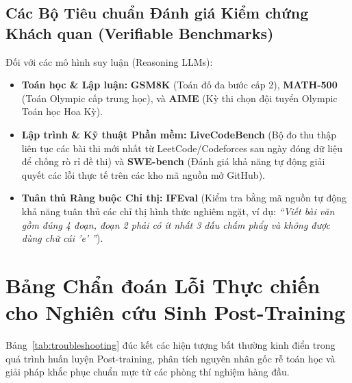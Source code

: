 \subsection{Các Bộ Tiêu chuẩn Đánh giá Kiểm chứng Khách quan (Verifiable Benchmarks)}
Đối với các mô hình suy luận (Reasoning LLMs):
\begin{itemize}[leftmargin=1.2cm]
    \item \textbf{Toán học \& Lập luận:} \textbf{GSM8K} \citep{cobbe2021training} (Toán đố đa bước cấp 2), \textbf{MATH-500} \citep{hendrycks2021measuring} (Toán Olympic cấp trung học), và \textbf{AIME} (Kỳ thi chọn đội tuyển Olympic Toán học Hoa Kỳ).
    \item \textbf{Lập trình \& Kỹ thuật Phần mềm:} \textbf{LiveCodeBench} \citep{jain2024livecodebench} (Bộ đo thu thập liên tục các bài thi mới nhất từ LeetCode/Codeforces sau ngày đóng dữ liệu để chống rò rỉ đề thi) và \textbf{SWE-bench} \citep{jimenez2024swebench} (Đánh giá khả năng tự động giải quyết các lỗi thực tế trên các kho mã nguồn mở GitHub).
    \item \textbf{Tuân thủ Ràng buộc Chỉ thị:} \textbf{IFEval} \citep{zhou2023instruction} (Kiểm tra bằng mã nguồn tự động khả năng tuân thủ các chỉ thị hình thức nghiêm ngặt, ví dụ: \textit{``Viết bài văn gồm đúng 4 đoạn, đoạn 2 phải có ít nhất 3 dấu chấm phẩy và không được dùng chữ cái 'e' ''}).
\end{itemize}

\section{Bảng Chẩn đoán Lỗi Thực chiến cho Nghiên cứu Sinh Post-Training}
\label{sec:troubleshooting_guide}

Bảng~\ref{tab:troubleshooting} đúc kết các hiện tượng bất thường kinh điển trong quá trình huấn luyện Post-training, phân tích nguyên nhân gốc rễ toán học và giải pháp khắc phục chuẩn mực từ các phòng thí nghiệm hàng đầu.

